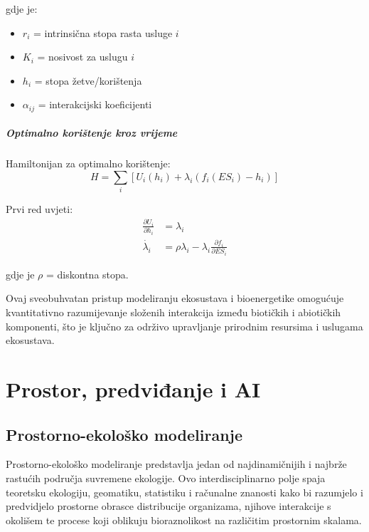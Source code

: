 \documentclass[11pt,oneside]{book}
\begin{document}
gdje je:
\begin{itemize}
	\item $r_i$ = intrinsična stopa rasta usluge $i$
	\item $K_i$ = nosivost za uslugu $i$  
	\item $h_i$ = stopa žetve/korištenja
	\item $\alpha_{ij}$ = interakcijski koeficijenti
\end{itemize}

\subsubsection{Optimalno korištenje kroz vrijeme}

Hamiltonijan za optimalno korištenje:
\begin{equation}
	H = \sum_i \left[ U_i(h_i) + \lambda_i \left( f_i(ES_i) - h_i \right) \right]
\end{equation}

Prvi red uvjeti:
\begin{align}
	\frac{\partial U_i}{\partial h_i} &= \lambda_i\\
	\dot{\lambda_i} &= \rho \lambda_i - \lambda_i \frac{\partial f_i}{\partial ES_i}
\end{align}

gdje je $\rho$ = diskontna stopa.

Ovaj sveobuhvatan pristup modeliranju ekosustava i bioenergetike omogućuje kvantitativno razumijevanje složenih interakcija između biotičkih i abiotičkih komponenti, što je ključno za održivo upravljanje prirodnim resursima i uslugama ekosustava.
	
	\part{Prostor, predviđanje i AI}
	
\chapter{Prostorno-ekološko modeliranje}

Prostorno-ekološko modeliranje predstavlja jedan od najdinamičnijih i najbrže rastućih područja suvremene ekologije. Ovo interdisciplinarno polje spaja teoretsku ekologiju, geomatiku, statistiku i računalne znanosti kako bi razumjelo i predvidjelo prostorne obrasce distribucije organizama, njihove interakcije s okolišem te procese koji oblikuju bioraznolikost na različitim prostornim skalama.
\end{document}
